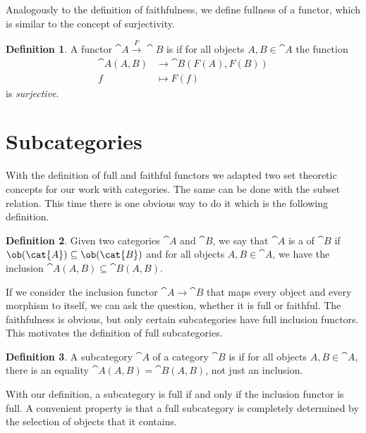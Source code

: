 \documentclass{article}
\theoremstyle{definition}
\newtheorem{definition}{Definition}
\begin{document}
Analogously to the definition of faithfulness, we define fullness of a functor, which is similar to the concept of surjectivity.

\begin{definition}
  A functor $\cat{A} \xrightarrow{F} \cat{B}$ is  if for all objects $A, B \in \cat{A}$ the function
  \begin{align*}
    \cat{A}(A, B) &\to \cat{B}(F(A), F(B)) \\
    f &\mapsto F(f)
  \end{align*}
  is \emph{surjective}.
\end{definition}


\section{Subcategories}

With the definition of full and faithful functors we adapted two set theoretic concepts for our work with categories.
The same can be done with the subset relation.
This time there is one obvious way to do it which is the following definition.

\begin{definition}
  Given two categories $\cat{A}$ and $\cat{B}$, we say that $\cat{A}$ is a  of $\cat{B}$ if $\ob(\cat{A}) \subseteq \ob(\cat{B})$ and for all objects $A, B \in \cat{A}$, we have the inclusion $\cat{A}(A, B) \subseteq \cat{B}(A, B)$.
\end{definition}

If we consider the inclusion functor $\cat{A} \to \cat{B}$ that maps every object and every morphism to itself, we can ask the question, whether it is full or faithful.
The faithfulness is obvious, but only certain subcategories have full inclusion functors.
This motivates the definition of full subcategories.

\begin{definition}
  A subcategory $\cat{A}$ of a category $\cat{B}$ is  if for all objects $A, B \in \cat{A}$, there is an equality $\cat{A}(A, B) = \cat{B}(A, B)$, not just an inclusion.
\end{definition}

With our definition, a subcategory is full if and only if the inclusion functor is full.
A convenient property is that a full subcategory is completely determined by the selection of objects that it contains.
\end{document}
